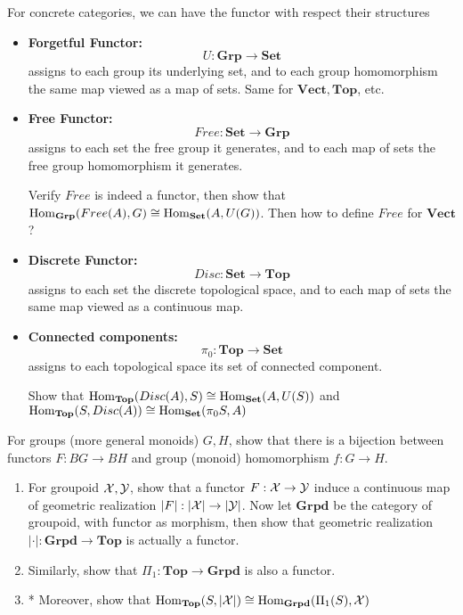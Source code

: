 \begin{example}
  For concrete categories, we can have the functor with respect their structures
 \begin{itemize}

    \item \textbf{Forgetful Functor:} 
    \[
    U: \mathbf{Grp} \to \mathbf{Set}
    \]
    assigns to each group its underlying set, and to each group homomorphism the same map viewed as a map of sets. Same for $\mathbf{Vect},\mathbf{Top}$, etc.
  \item \textbf{Free Functor:} 
    \[
    Free: \mathbf{Set} \to \mathbf{Grp}
    \]
    assigns to each set the free group it generates, and to each map of sets the free group homomorphism it generates.

    \begin{exercise}
      Verify $Free$ is indeed a functor, then show that \\ 
      $\mathrm{Hom}_{\mathbf{Grp}}(Free(A),G)\cong \mathrm{Hom}_{\mathbf{Set}}(A,U(G))$. Then how to define $Free$ for $\mathbf{Vect}$?
    \end{exercise}
  \item \textbf{Discrete Functor:}
    \[
    Disc: \mathbf{Set} \to \mathbf{Top}
    \]
    assigns to each set the discrete topological space, and to each map of sets the same map viewed as a continuous map.
  \item \textbf{Connected components:}
    \[
    \pi_0: \mathbf{Top} \to \mathbf{Set}
    \]
    assigns to each topological space its set of connected component.
    \begin{exercise}
     Show that $\mathrm{Hom}_{\mathbf{Top}}(Disc(A),S)\cong \mathrm{Hom}_{\mathbf{Set}}(A,U(S))$ and \\
     $\mathrm{Hom}_{\mathbf{Top}}(S, Disc(A))\cong \mathrm{Hom}_{\mathbf{Set}}(\pi_0S,A)$
    \end{exercise}
 \end{itemize} 

\end{example}

\begin{exercise}
 For groups (more general monoids) $G,H$, show that there is a bijection between functors $F:BG\to BH$ and group (monoid) homomorphism $f:G\to H$.    
\end{exercise}

\begin{exercise}
  \begin{enumerate}
    \item For groupoid $\mathcal{X},\mathcal{Y}$, show that a functor $F: \mathcal{X} \to \mathcal{Y}$ induce a continuous map of geometric realization $|F|:|\mathcal{X}| \to |\mathcal{Y}|$. Now let $\mathbf{Grpd}$ be  the category of groupoid, with functor as morphism, then show that geometric realization $|\cdot|: \mathbf{Grpd}\to \mathbf{Top}$ is actually a functor. 
    \item Similarly, show that $\Pi_1: \mathbf{Top}\to \mathbf{Grpd}$ is also a functor.
    \item* Moreover, show that $ \mathrm{Hom}_{\mathbf{Top}}(S, |\mathcal{X}|)\cong \mathrm{Hom}_{\mathbf{Grpd}}(\Pi_1(S),\mathcal{X})$
  \end{enumerate}
   
\end{exercise}

